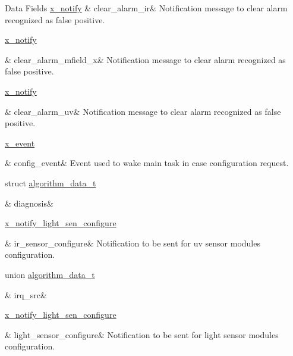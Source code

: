 \begin{DoxyFields}{Data Fields}
\hypertarget{a00016_a5ef7ebf1a1e20f770d46232ab2be8312}{\hyperlink{a00036_df/d4c/a00851}{x\+\_\+notify}}\label{a00016_a5ef7ebf1a1e20f770d46232ab2be8312}
&
clear\+\_\+alarm\+\_\+ir&
Notification message to clear alarm recognized as false positive. \\
\hline

\hypertarget{a00016_a57101a48bdde96a0db1ec63892095f7c}{\hyperlink{a00036_df/d4c/a00851}{x\+\_\+notify}}\label{a00016_a57101a48bdde96a0db1ec63892095f7c}
&
clear\+\_\+alarm\+\_\+mfield\+\_\+x&
Notification message to clear alarm recognized as false positive. \\
\hline

\hypertarget{a00016_a5d8e57dd19de326e75625a8704cfceee}{\hyperlink{a00036_df/d4c/a00851}{x\+\_\+notify}}\label{a00016_a5d8e57dd19de326e75625a8704cfceee}
&
clear\+\_\+alarm\+\_\+uv&
Notification message to clear alarm recognized as false positive. \\
\hline

\hypertarget{a00016_a461881ff0583945fd26ee6d5faf8ce1b}{\hyperlink{a00036_de/d37/a00849}{x\+\_\+event}}\label{a00016_a461881ff0583945fd26ee6d5faf8ce1b}
&
config\+\_\+event&
Event used to wake main task in case configuration request. \\
\hline

\hypertarget{a00016_a16f85d57ec98b4ad05f5a2e10536b3c6}{struct \hyperlink{a00016_d1/d44/a00098}{algorithm\+\_\+data\+\_\+t}}\label{a00016_a16f85d57ec98b4ad05f5a2e10536b3c6}
&
diagnosis&
\\
\hline

\hypertarget{a00016_ac6483a3473f539f671660ae458d889d3}{\hyperlink{a00018_da/de3/a00856}{x\+\_\+notify\+\_\+light\+\_\+sen\+\_\+configure}}\label{a00016_ac6483a3473f539f671660ae458d889d3}
&
ir\+\_\+sensor\+\_\+configure&
Notification to be sent for uv sensor modules configuration. \\
\hline

\hypertarget{a00016_a1aafd556b3c9ed3e5295b17dbd80cab8}{union \hyperlink{a00016_d3/d32/a00105}{algorithm\+\_\+data\+\_\+t}}\label{a00016_a1aafd556b3c9ed3e5295b17dbd80cab8}
&
irq\+\_\+src&
\\
\hline

\hypertarget{a00016_a8fc7528336e37724802eb52753c7b7a6}{\hyperlink{a00018_da/de3/a00856}{x\+\_\+notify\+\_\+light\+\_\+sen\+\_\+configure}}\label{a00016_a8fc7528336e37724802eb52753c7b7a6}
&
light\+\_\+sensor\+\_\+configure&
Notification to be sent for light sensor modules configuration. \\
\hline


\end{DoxyFields}
